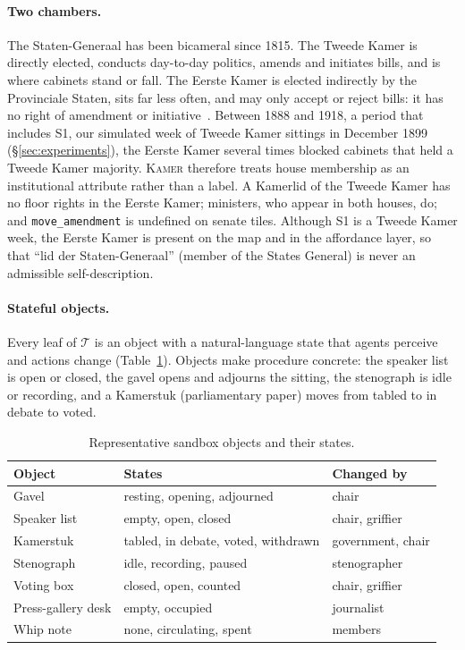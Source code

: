 \documentclass[sigconf,review,anonymous]{acmart}
\newcommand{\sys}{\textsc{Kamer}}
\begin{document}
\paragraph{Two chambers.} The Staten-Generaal has been bicameral since 1815.
The Tweede Kamer is directly elected, conducts day-to-day politics, amends
and initiates bills, and is where cabinets stand or fall. The Eerste Kamer
is elected indirectly by the Provinciale Staten, sits far less often, and
may only accept or reject bills: it has no right of amendment or
initiative~\cite{pdc2024kamers}. Between 1888 and 1918, a period that
includes S1, our simulated week of Tweede Kamer sittings in December 1899
(\S\ref{sec:experiments}), the Eerste Kamer several times blocked cabinets
that held a Tweede Kamer majority. \sys{} therefore treats house membership as
an institutional attribute rather than a label. A Kamerlid of the Tweede
Kamer has no floor rights in the Eerste Kamer; ministers, who appear in
both houses, do; and \texttt{move\_amendment} is undefined on senate tiles.
Although S1 is a Tweede Kamer week, the Eerste Kamer is present on the map
and in the affordance layer, so that ``lid der Staten-Generaal'' (member of
the States General) is never an admissible self-description.

\paragraph{Stateful objects.} Every leaf of $\mathcal{T}$ is an object with
a natural-language state that agents perceive and actions change
(Table~\ref{tab:objects}). Objects make procedure concrete: the speaker list
is open or closed, the gavel opens and adjourns the sitting, the stenograph
is idle or recording, and a Kamerstuk (parliamentary paper) moves from
tabled to in debate to voted.

\begin{table}[t]
\caption{Representative sandbox objects and their states.}
\label{tab:objects}
\centering\small
\setlength{\tabcolsep}{3pt}
\begin{tabular}{lll}
\toprule
Object & States & Changed by \\
\midrule
Gavel & resting, opening, adjourned & chair \\
Speaker list & empty, open, closed & chair, griffier \\
Kamerstuk & tabled, in debate, voted, withdrawn & government, chair \\
Stenograph & idle, recording, paused & stenographer \\
Voting box & closed, open, counted & chair, griffier \\
Press-gallery desk & empty, occupied & journalist \\
Whip note & none, circulating, spent & members \\
\bottomrule
\end{tabular}
\end{table}
\end{document}

